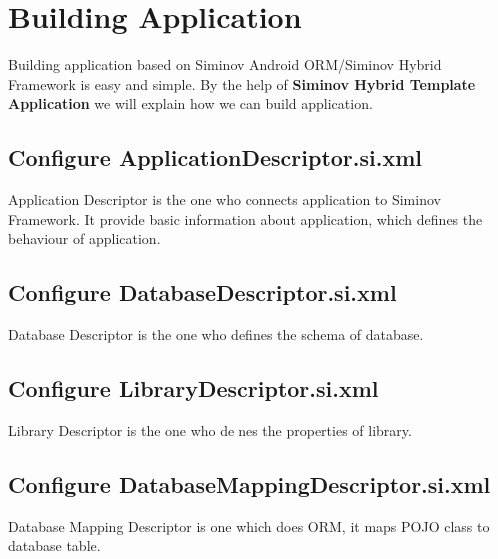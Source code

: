 \newpage
\chapter {\Large{Building Application}}
Building application based on Siminov Android ORM/Siminov Hybrid Framework is easy and simple. By the help of \textbf{Siminov Hybrid Template Application} we will explain how we can build application.


\section{Configure ApplicationDescriptor.si.xml}
Application Descriptor is the one who connects application to Siminov Framework. It provide basic information about application, which defines the behaviour of application.

	



\section{Configure DatabaseDescriptor.si.xml}
Database Descriptor is the one who defines the schema of database.

	


\section{Configure LibraryDescriptor.si.xml}
Library Descriptor is the one who denes the properties of library.


	


\section{Configure DatabaseMappingDescriptor.si.xml}
Database Mapping Descriptor is one which does ORM, it maps POJO class to database table.

	



